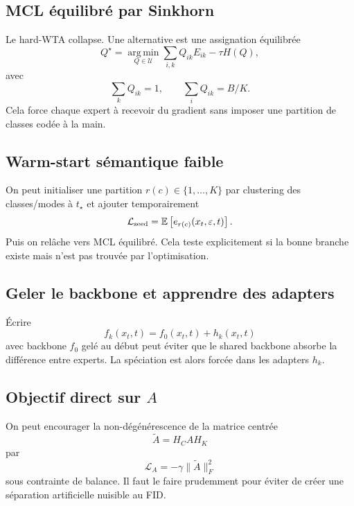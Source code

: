 \documentclass[11pt,a4paper]{article}
\newcommand{\E}{\mathbb{E}}
\newcommand{\argmin}{\operatorname*{arg\,min}}
\newcommand{\1}{\mathbf{1}}
\newcommand{\eps}{\varepsilon}
\newcommand{\xt}{x_t}
\begin{document}
\subsection{MCL équilibré par Sinkhorn}

Le hard-WTA collapse. Une alternative est une assignation équilibrée
\begin{equation}
Q^\star=\argmin_{Q\in\mathcal U}\sum_{i,k}Q_{ik}E_{ik}-\tau H(Q),
\end{equation}
avec
\begin{equation}
\sum_k Q_{ik}=1,
\qquad
\sum_i Q_{ik}=B/K.
\end{equation}
Cela force chaque expert à recevoir du gradient sans imposer une partition de classes codée à la main.

\subsection{Warm-start sémantique faible}

On peut initialiser une partition $r(c)\in\{1,\dots,K\}$ par clustering des classes/modes à $t_\star$ et ajouter temporairement
\begin{equation}
\mathcal L_{\rm seed}=\E\left[e_{r(c)}(\xt,\eps,t)\right].
\end{equation}
Puis on relâche vers MCL équilibré. Cela teste explicitement si la bonne branche existe mais n'est pas trouvée par l'optimisation.

\subsection{Geler le backbone et apprendre des adapters}

Écrire
\begin{equation}
f_k(\xt,t)=f_0(\xt,t)+h_k(\xt,t)
\end{equation}
avec backbone $f_0$ gelé au début peut éviter que le shared backbone absorbe la différence entre experts. La spéciation est alors forcée dans les adapters $h_k$.

\subsection{Objectif direct sur $A$}

On peut encourager la non-dégénérescence de la matrice centrée
\begin{equation}
\widetilde A=H_CAH_K
\end{equation}
par
\begin{equation}
\mathcal L_A=-\gamma\|\widetilde A\|_F^2
\end{equation}
sous contrainte de balance. Il faut le faire prudemment pour éviter de créer une séparation artificielle nuisible au FID.
\end{document}
